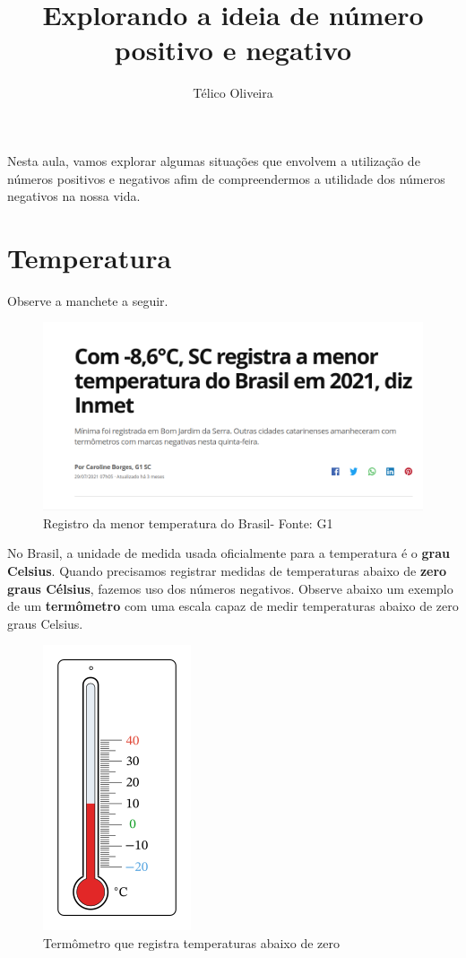 \documentclass{article}
\title{Explorando a ideia de número positivo e negativo}
\author{Télico Oliveira}
\begin{document}
\maketitle
Nesta aula, vamos explorar algumas situações que envolvem a utilização de números positivos e negativos afim de compreendermos a utilidade dos números negativos na nossa vida. 
\section{Temperatura}
Observe a manchete a seguir.
\begin{figure}[htb]
    \centering
    \includegraphics[scale = 0.3]{temp1.png}
    \caption{Registro da menor temperatura do Brasil- Fonte: G1}
    \label{fig:my_label}
\end{figure}
No Brasil, a unidade de medida usada oficialmente para a temperatura é o \textbf{grau Celsius}. Quando precisamos registrar medidas de temperaturas abaixo de \textbf{zero graus Célsius}, fazemos uso dos números negativos. Observe abaixo um exemplo de um \textbf{termômetro} com uma escala capaz de medir temperaturas abaixo de zero graus Celsius.
\begin{figure}[htb]
    \centering
    \includegraphics[scale=0.6]{term.png}
    \caption{Termômetro que registra temperaturas abaixo de zero}
    \label{fig:my_label}
\end{figure}
\end{document}
